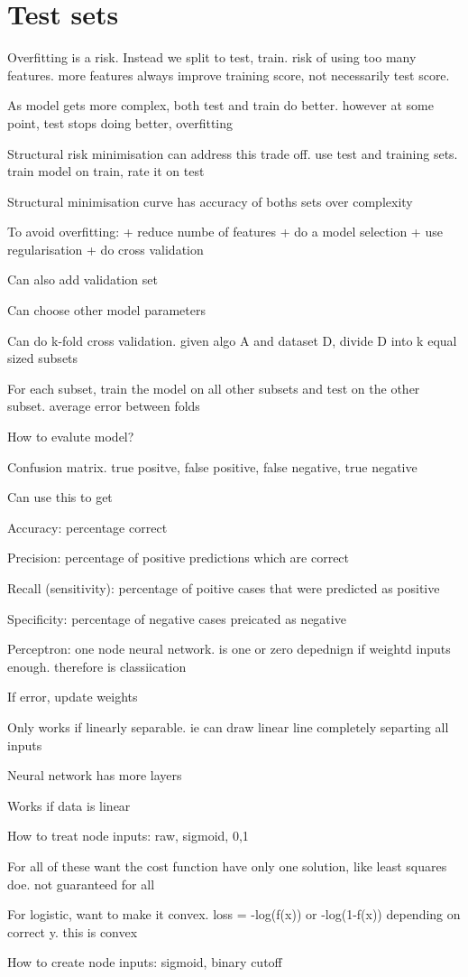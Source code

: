 
\section{Test sets}

Overfitting is a risk. Instead we split to test, train. risk of using too many features. more features always improve training score, not necessarily test score.

As model gets more complex, both test and train do better. however at some point, test stops doing better, overfitting

Structural risk minimisation can address this trade off. use test and training sets. train model on train, rate it on test

Structural minimisation curve has accuracy of boths sets over complexity

To avoid overfitting:
+ reduce numbe of features
+ do a model selection
+ use regularisation
+ do cross validation 

Can also add validation set

Can choose other model parameters

Can do k-fold cross validation. given algo A and dataset D, divide D into k equal sized subsets

For each subset, train the model on all other subsets and test on the other subset. average error between folds

How to evalute model?

Confusion matrix. true positve, false positive, false negative, true negative

Can use this to get

Accuracy: percentage correct

Precision: percentage of positive predictions which are correct

Recall (sensitivity): percentage of poitive cases that were predicted as positive

Specificity: percentage of negative cases preicated as negative 

Perceptron: one node neural network. is one or zero depednign if weightd inputs enough. therefore is classiication

If error, update weights

Only works if linearly separable. ie can draw linear line completely separting all inputs

Neural network has more layers

Works if data is linear

How to treat node inputs: raw, sigmoid, {0,1}

For all of these want the cost function have only one solution, like least squares doe. not guaranteed for all

For logistic, want to make it convex. loss = -log(f(x)) or -log(1-f(x)) depending on correct y. this is convex

How to create node inputs: sigmoid, binary cutoff

